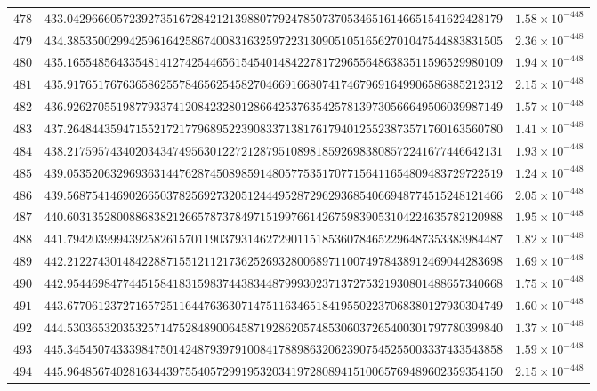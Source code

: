 \documentclass[12pt,reqno]{amsart}
\theoremstyle{remark}
\begin{document}
\begin{longtable}{clc}
$478$ & $433.0429666057239273516728421213988077924785073705346516146651541622428179$ & $1.58\times 10^{-448}$ \\
$479$ & $434.3853500299425961642586740083163259722313090510516562701047544883831505$ & $2.36\times 10^{-448}$ \\
$480$ & $435.1655485643354814127425446561545401484227817296556486383511596529980109$ & $1.94\times 10^{-448}$ \\
$481$ & $435.9176517676365862557846562545827046691668074174679691649906586885212312$ & $2.15\times 10^{-448}$ \\
$482$ & $436.9262705519877933741208423280128664253763542578139730566649506039987149$ & $1.57\times 10^{-448}$ \\
$483$ & $437.2648443594715521721779689522390833713817617940125523873571760163560780$ & $1.41\times 10^{-448}$ \\
$484$ & $438.2175957434020343474956301227212879510898185926983808572241677446642131$ & $1.93\times 10^{-448}$ \\
$485$ & $439.0535206329693631447628745089859148057753517077156411654809483729722519$ & $1.24\times 10^{-448}$ \\
$486$ & $439.5687541469026650378256927320512444952872962936854066948774515248121466$ & $2.05\times 10^{-448}$ \\
$487$ & $440.6031352800886838212665787378497151997661426759839053104224635782120988$ & $1.95\times 10^{-448}$ \\
$488$ & $441.7942039994392582615701190379314627290115185360784652296487353383984487$ & $1.82\times 10^{-448}$ \\
$489$ & $442.2122743014842288715512112173625269328006897110074978438912469044283698$ & $1.69\times 10^{-448}$ \\
$490$ & $442.9544698477445158418315983744383448799930237137275321930801488657340668$ & $1.75\times 10^{-448}$ \\
$491$ & $443.6770612372716572511644763630714751163465184195502237068380127930304749$ & $1.60\times 10^{-448}$ \\
$492$ & $444.5303653203532571475284890064587192862057485306037265400301797780399840$ & $1.37\times 10^{-448}$ \\
$493$ & $445.3454507433398475014248793979100841788986320623907545255003337433543858$ & $1.59\times 10^{-448}$ \\
$494$ & $445.9648567402816344397554057299195320341972808941510065769489602359354150$ & $2.15\times 10^{-448}$ \\

\end{longtable}
\end{document}
